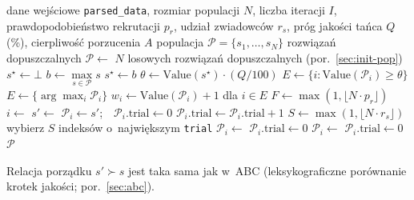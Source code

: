 \begin{algorithm}[H]
\caption{Generowanie populacji metodą BA (ogólny zarys)}
\label{alg:bee-overview}
\begin{algorithmic}[1]
\Require dane wejściowe \texttt{parsed\_data}, rozmiar populacji $N$, liczba iteracji $I$, prawdopodobieństwo rekrutacji $p_r$, udział zwiadowców $r_s$, próg jakości tańca $Q$ (\%), cierpliwość porzucenia $A$
\Ensure populacja $\mathcal{P} = \{s_1, \dots, s_N\}$ rozwiązań dopuszczalnych
\State $\mathcal{P} \gets$ $N$ losowych rozwiązań dopuszczalnych (por.\ \cref{sec:init-pop})
\State $s^\star \gets \bot$
    \State $b \gets \max\limits_{s \in \mathcal{P}} s$ 
     \State $s^\star \gets b$ \EndIf
    \State $\theta \gets \mathrm{Value}(s^\star) \cdot (Q/100)$ 
    \State $E \gets \{ i : \mathrm{Value}(\mathcal{P}_i) \ge \theta \}$ 
     \State $E \gets \{\arg\max_i \mathcal{P}_i\}$ \EndIf
    \State $w_i \gets \mathrm{Value}(\mathcal{P}_i) + 1$ dla $i \in E$ 
    \State $F \gets \max(1, \lfloor N \cdot p_r \rfloor)$ 
        \State $i \gets$ 
        \State $s' \gets$  
            \State $\mathcal{P}_i \gets s'$;\ \ $\mathcal{P}_i.\text{trial} \gets 0$
        \Else
            \State $\mathcal{P}_i.\text{trial} \gets \mathcal{P}_i.\text{trial} + 1$
        \EndIf
    \EndFor
    \State $S \gets \max(1, \lfloor N \cdot r_s \rfloor)$ 
    \State wybierz $S$ indeksów o~największym \texttt{trial}
        \State $\mathcal{P}_i \gets$ 
        \State $\mathcal{P}_i.\text{trial} \gets 0$
    \EndFor
     
            \State $\mathcal{P}_i \gets$ 
            \State $\mathcal{P}_i.\text{trial} \gets 0$
        \EndIf
    \EndFor
\EndFor
\State \Return $\mathcal{P}$
\end{algorithmic}
\end{algorithm}

Relacja porządku $s' \succ s$ jest taka sama jak w~ABC (leksykograficzne
porównanie krotek jakości; por.\ \cref{sec:abc}).

